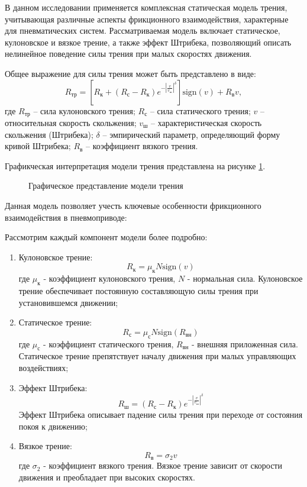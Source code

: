 В данном исследовании применяется комплексная статическая модель трения, учитывающая
различные аспекты фрикционного взаимодействия, характерные для пневматических систем.
Рассматриваемая модель включает статическое, кулоновское и вязкое трение, а также эффект
Штрибека, позволяющий описать нелинейное поведение силы трения при малых скоростях движения.

Общее выражение для силы трения может быть представлено в виде:
\begin{equation}\label{eq:ch2/friction_model}
    R_\text{тр} = \left[R_\text{к} + (R_\text{с} -
        R_\text{к})e^{-\left|\frac{v}{v_\text{ш}}\right|^\delta}\right]
    \text{sign}(v) + R_\text{в} v,
\end{equation}
где $R_\text{тр}$ -- сила кулоновского трения;
$R_\text{с}$  -- сила статического трения;
$v$ -- относительная скорость скольжения;
$v_\text{ш}$ -- характеристическая скорость скольжения (Штрибека);
$\delta$ -- эмпирический параметр, определяющий форму кривой Штрибека;
$R_\text{в}$ -- коэффициент вязкого трения.

Графикческая интерпретация модели трения представлена на рисунке \ref{fig:ch2/friction_model}.
\begin{figure}[ht]
    \caption{Графическое представление модели трения}
    \label{fig:ch2/friction_model}
\end{figure}

Данная модель позволяет учесть ключевые особенности фрикционного взаимодействия в пневмоприводе:

Рассмотрим каждый компонент модели более подробно:
\begin{enumerate}
    \item Кулоновское трение:
          $$R_\text{к} = \mu_\text{к} N \text{sign}(v)$$
          где $\mu_\text{к}$ - коэффициент кулоновского трения, $N$ - нормальная сила. Кулоновское трение обеспечивает
          постоянную составляющую силы трения при установившемся движении;

    \item Статическое трение:
          $$R_\text{с} = \mu_\text{с} N \text{sign}(R_\text{вн})$$
          где $\mu_\text{с}$ - коэффициент статического трения, $R_\text{вн}$ - внешняя приложенная сила.
          Статическое трение препятствует началу движения при малых управляющих воздействиях;

    \item Эффект Штрибека:
          $$R_\text{ш} = (R_\text{с} - R_\text{к})e^{-\left|\frac{v}{v_\text{ш}}\right|^\delta}$$
          Эффект Штрибека описывает падение силы трения при переходе от состояния покоя к движению;

    \item Вязкое трение:
          $$R_\text{в} = \sigma_2 v$$
          где $\sigma_2$ - коэффициент вязкого трения. Вязкое трение зависит от скорости движения и преобладает при высоких скоростях.

\end{enumerate}

